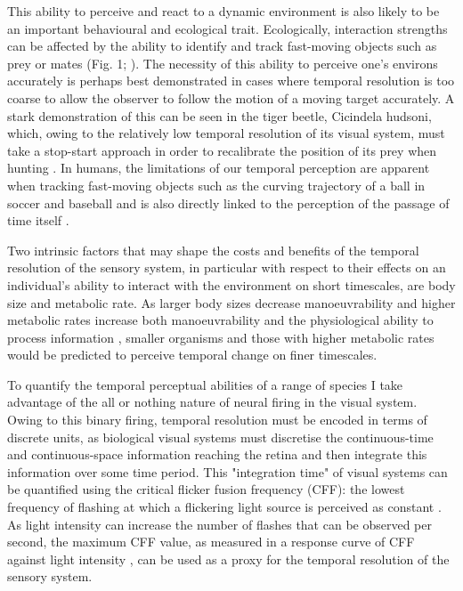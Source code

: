 This ability to perceive and react to a dynamic environment is also likely to be an important behavioural and ecological trait. Ecologically, interaction strengths can be affected by the ability to identify and track fast-moving objects such as prey or mates (Fig. 1; \citealt{land1974chasing, fritsches2005warm}). The necessity of this ability to perceive one's environs accurately is perhaps best demonstrated in cases where temporal resolution is too coarse to allow the observer to follow the motion of a moving target accurately. A stark demonstration of this can be seen in the tiger beetle, Cicindela hudsoni, which, owing to the relatively low temporal resolution of its visual system, must take a stop-start approach in order to recalibrate the position of its prey when hunting \citep{gilbert1997visual}. In humans, the limitations of our temporal perception are apparent when tracking fast-moving objects such as the curving trajectory of a ball in soccer \citep{dessing2010bending} and baseball \citep{bahill2004rising} and is also directly linked to the perception of the passage of time itself \citep{hagura2012ready}. 

Two intrinsic factors that may shape the costs and benefits of the temporal resolution of the sensory system, in particular with respect to their effects on an individual's ability to interact with the environment on short timescales, are body size and metabolic rate. As larger body sizes decrease manoeuvrability \citep{heglund1988speed,dudley2002mechanisms,biewener2003animal,sato2007stroke,vogel2008modes,hedrick2011damping,watanabe2012slowest} and higher metabolic rates increase both manoeuvrability and the physiological ability to process information \citep{li2008optimal,franz2002temperature}, smaller organisms and those with higher metabolic rates would be predicted to perceive temporal change on finer timescales.

To quantify the temporal perceptual abilities of a range of species I take advantage of the all or nothing nature of neural firing in the visual system. Owing to this binary firing, temporal resolution must be encoded in terms of discrete units, as biological visual systems must discretise the continuous-time and continuous-space information reaching the retina and then integrate this information over some time period. This "integration time" of visual systems can be quantified using the critical flicker fusion frequency (CFF): the lowest frequency of flashing at which a flickering light source is perceived as constant \citep{d1998can,schwartz2010visual}. As light intensity can increase the number of flashes that can be observed per second, the maximum CFF value, as measured in a response curve of CFF against light intensity \citep{ferry1892persistence,porter1902contributions}, can be used as a proxy for the temporal resolution of the sensory system.

